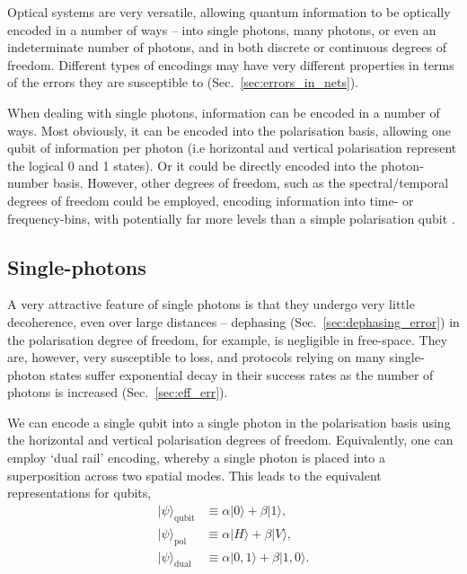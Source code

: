 \documentclass[aps,rmp,twocolumn,amsmath,amssymb,nofootinbib,superscriptaddress]{revtex4}
\newcommand{\ket}[1]{|#1\rangle}
\begin{document}
Optical systems are very versatile, allowing quantum information to be optically encoded in a number of ways -- into single photons, many photons, or even an indeterminate number of photons, and in both discrete or continuous degrees of freedom. Different types of encodings may have very different properties in terms of the errors they are susceptible to (Sec.~\ref{sec:errors_in_nets}).

When dealing with single photons, information can be encoded in a number of ways. Most obviously, it can be encoded into the polarisation basis, allowing one qubit of information per photon (i.e horizontal and vertical polarisation represent the logical 0 and 1 states). Or it could be directly encoded into the photon-number basis. However, other degrees of freedom, such as the spectral/temporal degrees of freedom could be employed, encoding information into time- or frequency-bins, with potentially far more levels than a simple polarisation qubit \cite{bib:RohdeInfCap13}.

%
%

\subsection{Single-photons} \label{sec:single_phot_enc}

A very attractive feature of single photons is that they undergo very little decoherence, even over large distances -- dephasing (Sec.~\ref{sec:dephasing_error}) in the polarisation degree of freedom, for example, is negligible in free-space. They are, however, very susceptible to loss, and protocols relying on many single-photon states suffer exponential decay in their success rates as the number of photons is increased (Sec.~\ref{sec:eff_err}).

We can encode a single qubit into a single photon in the polarisation basis using the horizontal and vertical polarisation degrees of freedom. Equivalently, one can employ `dual rail' encoding, whereby a single photon is placed into a superposition across two spatial modes. This leads to the equivalent representations for qubits,
\begin{align} \label{eq:single_photon_enc}
\ket{\psi}_\mathrm{qubit} &\equiv \alpha\ket{0} + \beta\ket{1}, \nonumber \\
\ket{\psi}_\mathrm{pol} &\equiv \alpha\ket{H} + \beta\ket{V}, \nonumber \\
\ket{\psi}_\mathrm{dual} &\equiv \alpha\ket{0,1} + \beta\ket{1,0}.
\end{align}
\end{document}
